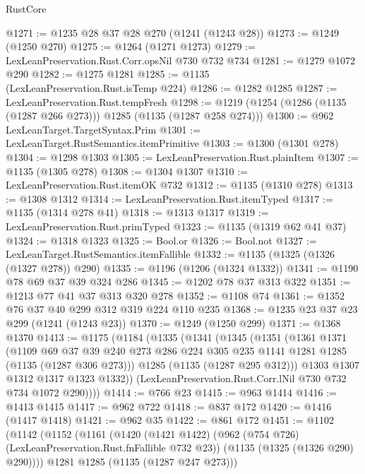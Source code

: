 \begin{lexlean}{RustCore}
\begin{coremodule}
@1271 := @1235 @28 @37 @28 @270 (@1241 (@1243 @28))
@1273 := @1249 (@1250 @270)
@1275 := @1264 (@1271 @1273)
@1279 := LexLeanPreservation.Rust.Corr.opsNil @730 @732 @734
@1281 := @1279 @1072 @290
@1282 := @1275 @1281
@1285 := @1135 (LexLeanPreservation.Rust.isTemp @224)
@1286 := @1282 @1285
@1287 := LexLeanPreservation.Rust.tempFresh
@1298 := @1219 (@1254 (@1286 (@1135 (@1287 @266 @273))) @1285 (@1135 (@1287 @258 @274)))
@1300 := @962 LexLeanTarget.TargetSyntax.Prim
@1301 := LexLeanTarget.RustSemantics.itemPrimitive
@1303 := @1300 (@1301 @278)
@1304 := @1298 @1303
@1305 := LexLeanPreservation.Rust.plainItem
@1307 := @1135 (@1305 @278)
@1308 := @1304 @1307
@1310 := LexLeanPreservation.Rust.itemOK @732
@1312 := @1135 (@1310 @278)
@1313 := @1308 @1312
@1314 := LexLeanPreservation.Rust.itemTyped
@1317 := @1135 (@1314 @278 @41)
@1318 := @1313 @1317
@1319 := LexLeanPreservation.Rust.primTyped
@1323 := @1135 (@1319 @62 @41 @37)
@1324 := @1318 @1323
@1325 := Bool.or
@1326 := Bool.not
@1327 := LexLeanTarget.RustSemantics.itemFallible
@1332 := @1135 (@1325 (@1326 (@1327 @278)) @290)
@1335 := @1196 (@1206 (@1324 @1332))
@1341 := @1190 @78 @69 @37 @39 @324 @286
@1345 := @1202 @78 @37 @313 @322
@1351 := @1213 @77 @41 @37 @313 @320 @278
@1352 := @1108 @74
@1361 := @1352 @76 @37 @40 @299 @312 @319 @224 @110 @235
@1368 := @1235 @23 @37 @23 @299 (@1241 (@1243 @23))
@1370 := @1249 (@1250 @299)
@1371 := @1368 @1370
@1413 := @1175
    (@1184
      (@1335
        (@1341
          (@1345
            (@1351
              (@1361
                @1371
                (@1109
                  @69
                  @37
                  @39
                  @240
                  @273
                  @286
                  @224
                  @305
                  @235
                  @1141
                  @1281
                  @1285
                  (@1135 (@1287 @306 @273)))
                @1285
                (@1135 (@1287 @295 @312)))
              @1303
              @1307
              @1312
              @1317
              @1323
              @1332))
          (LexLeanPreservation.Rust.Corr.lNil @730 @732 @734 @1072 @290))))
@1414 := @766 @23
@1415 := @963 @1414
@1416 := @1413 @1415
@1417 := @962 @722
@1418 := @837 @172
@1420 := @1416 (@1417 @1418)
@1421 := @962 @35
@1422 := @861 @172
@1451 := @1102
    (@1142
      (@1152
        (@1161
          (@1420
            (@1421 @1422)
            (@962 (@754 @726) (LexLeanPreservation.Rust.fnFallible @732 @23))
            (@1135 (@1325 (@1326 @290) @290))))
        @1281
        @1285
        (@1135 (@1287 @247 @273)))

\end{coremodule}
\end{lexlean}
